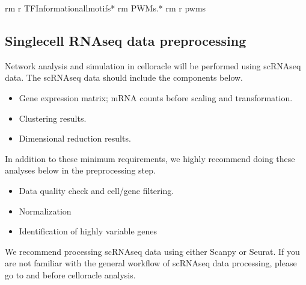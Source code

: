 \documentclass[letterpaper,10pt,english]{sphinxmanual}
\begin{document}
{
\begin{sphinxVerbatim}[commandchars=\\\{\}]
\llap{\color{nbsphinxin}[1]:\,\hspace{\fboxrule}\hspace{\fboxsep}} rm \PYGZhy{}r TF\PYGZus{}Information\PYGZus{}all\PYGZus{}motifs*
 rm PWMs.*
 rm \PYGZhy{}r pwms

\end{sphinxVerbatim}
}


\subsection{Single\sphinxhyphen{}cell RNA\sphinxhyphen{}seq data preprocessing}
\label{\detokenize{tutorials/scrnaprocess:single-cell-rna-seq-data-preprocessing}}\label{\detokenize{tutorials/scrnaprocess:scrnaprocess}}\label{\detokenize{tutorials/scrnaprocess::doc}}
Network analysis and simulation in celloracle will be performed using scRNA\sphinxhyphen{}seq data. The scRNA\sphinxhyphen{}seq data should include the components below.
\begin{itemize}
\item {} 
Gene expression matrix; mRNA counts before scaling and transformation.

\item {} 
Clustering results.

\item {} 
Dimensional reduction results.

\end{itemize}

In addition to these minimum requirements, we highly recommend doing these analyses below in the preprocessing step.
\begin{itemize}
\item {} 
Data quality check and cell/gene filtering.

\item {} 
Normalization

\item {} 
Identification of highly variable genes

\end{itemize}

We recommend processing scRNA\sphinxhyphen{}seq data using either Scanpy or Seurat.
If you are not familiar with the general workflow of scRNA\sphinxhyphen{}seq data processing, please go to  and  before celloracle analysis.
\end{document}
